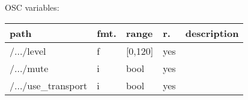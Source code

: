 \begin{snugshade}
{\footnotesize
\label{osctab:tascarappink}
OSC variables:
\nopagebreak

\begin{tabularx}{\textwidth}{llllX}
\hline
path & fmt. & range & r. & description\\
\hline
/.../level & f & [0,120] & yes & \\
/.../mute & i & bool & yes & \\
/.../use\_transport & i & bool & yes & \\
\hline
\end{tabularx}
}
\end{snugshade}
